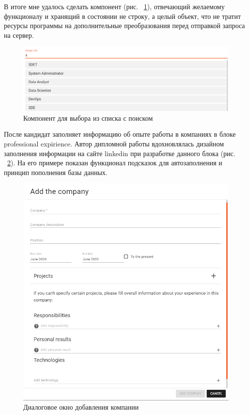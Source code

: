 \documentclass[14pt, a4paper]{diplom}
\begin{document}
В итоге мне удалось сделать компонент (рис. ~\ref{8}), отвечающий желаемому функционалу и хранящий в состоянии не строку, а целый объект, что
не тратит ресурсы программы на дополнительные преобразования перед отправкой запроса на сервер.

\begin{figure}[!ht]
\centering
\includegraphics[width=1\textwidth]{resources/role.png}
\caption{Компонент для выбора из списка с поиском}
\label{8}
\end{figure}

После кандидат заполняет информацию об опыте работы в компаниях в блоке professional expirience. Автор дипломной работы вдохновлялась дизайном заполнения информации на сайте linkedin при разработке данного блока (рис. ~\ref{9}).
На его примере показан функционал подсказок для автозаполнения и принцип пополнения базы данных.
\begin{figure}[!ht]
\centering
\includegraphics[width=1\textwidth]{resources/companycard.png}
\caption{Диалоговое окно добавления компании}
\label{9}
\end{figure}
\end{document}
